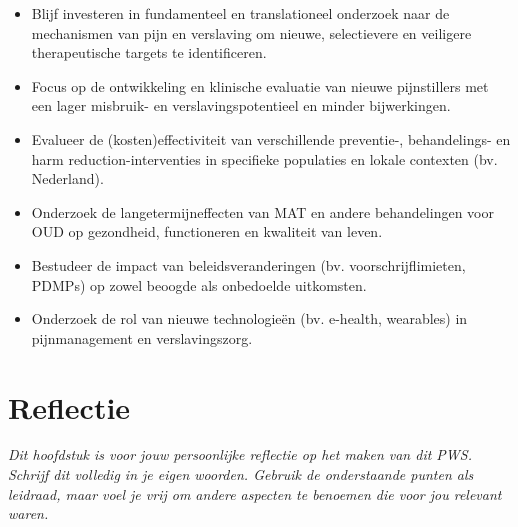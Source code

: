 \documentclass[11pt, a4paper]{report} %
\begin{document}
\begin{itemize}
\begin{itemize}
            \item Blijf investeren in fundamenteel en translationeel onderzoek naar de mechanismen van pijn en verslaving om nieuwe, selectievere en veiligere therapeutische targets te identificeren.
            \item Focus op de ontwikkeling en klinische evaluatie van nieuwe pijnstillers met een lager misbruik- en verslavingspotentieel en minder bijwerkingen.
            \item Evalueer de (kosten)effectiviteit van verschillende preventie-, behandelings- en harm reduction-interventies in specifieke populaties en lokale contexten (bv. Nederland).
            \item Onderzoek de langetermijneffecten van MAT en andere behandelingen voor OUD op gezondheid, functioneren en kwaliteit van leven.
            \item Bestudeer de impact van beleidsveranderingen (bv. voorschrijflimieten, PDMPs) op zowel beoogde als onbedoelde uitkomsten.
            \item Onderzoek de rol van nieuwe technologieën (bv. e-health, wearables) in pijnmanagement en verslavingszorg.
        \end{itemize}
\end{itemize}


\chapter{Reflectie}
\label{chap:reflectie}

\textit{Dit hoofdstuk is voor jouw persoonlijke reflectie op het maken van dit PWS. Schrijf dit volledig in je eigen woorden. Gebruik de onderstaande punten als leidraad, maar voel je vrij om andere aspecten te benoemen die voor jou relevant waren.}
\end{document}
